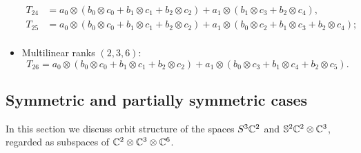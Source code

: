 \begin{itemize}
\begin{align*}
T_{24} &= a_0 \otimes (b_0 \otimes c_0 + b_1 \otimes c_1 + b_2 \otimes c_2) + a_1 \otimes (b_1 \otimes c_3 + b_2 \otimes c_4), \\
T_{25} &= a_0 \otimes (b_0 \otimes c_0 +  b_1 \otimes c_1 + b_2 \otimes c_2) + a_1 \otimes (b_0 \otimes c_2 + b_1 \otimes c_3 + b_2 \otimes c_4);\\
\end{align*}
\item Multilinear ranks $(2,3,6)$:
\[
T_{26} = a_0 \otimes (b_0 \otimes c_0 +  b_1 \otimes c_1 + b_2 \otimes c_2) + a_1 \otimes (b_0 \otimes c_3 + b_1 \otimes c_4 + b_2 \otimes c_5).
\]
\end{itemize}

% 

\subsection*{Symmetric and partially symmetric cases}

In this section we discuss orbit structure of the spaces $S^3 \mathbb{C}^2$ and $\mathbb{S}^2 \mathbb{C}^2 \otimes \mathbb{C}^3$, regarded as subspaces of $\mathbb{C}^2 \otimes \mathbb{C}^3 \otimes \mathbb{C}^6$.
